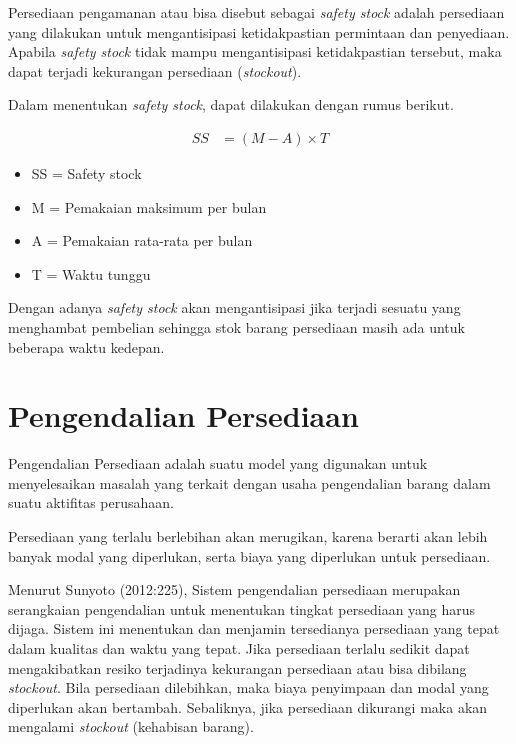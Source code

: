 Persediaan pengamanan atau bisa disebut sebagai  \textit{safety stock} adalah persediaan yang dilakukan untuk mengantisipasi ketidakpastian permintaan dan penyediaan. Apabila \textit{safety stock} tidak mampu mengantisipasi ketidakpastian tersebut, maka dapat terjadi kekurangan persediaan (\textit{stockout}).

Dalam menentukan \textit{safety stock}, dapat dilakukan dengan rumus berikut.

\begin{equation}
    \begin{split}
		SS
		&= (M - A) \times T 
    \end{split}
\end{equation}

\begin{itemize}
	\item SS = Safety stock
	\item M = Pemakaian maksimum per bulan
	\item A = Pemakaian rata-rata per bulan
	\item T = Waktu tunggu
\end{itemize}

Dengan adanya \textit{safety stock} akan mengantisipasi jika terjadi sesuatu yang menghambat pembelian sehingga stok barang persediaan masih ada untuk beberapa waktu kedepan.

\section{Pengendalian Persediaan}

Pengendalian Persediaan adalah suatu model yang digunakan untuk menyelesaikan masalah yang terkait dengan usaha pengendalian barang dalam suatu aktifitas perusahaan.

Persediaan yang terlalu berlebihan akan merugikan, karena berarti akan lebih banyak modal yang diperlukan, serta biaya yang diperlukan untuk persediaan.

Menurut Sunyoto (2012:225), Sistem pengendalian persediaan merupakan serangkaian pengendalian untuk menentukan tingkat persediaan yang harus dijaga. Sistem ini menentukan dan menjamin tersedianya persediaan yang tepat dalam kualitas dan waktu yang tepat. Jika persediaan terlalu sedikit dapat mengakibatkan resiko terjadinya kekurangan persediaan atau bisa dibilang \textit{stockout}. Bila persediaan dilebihkan, maka biaya penyimpaan dan modal yang diperlukan akan bertambah. Sebaliknya, jika persediaan dikurangi maka akan mengalami \textit{stockout} (kehabisan barang).
 

